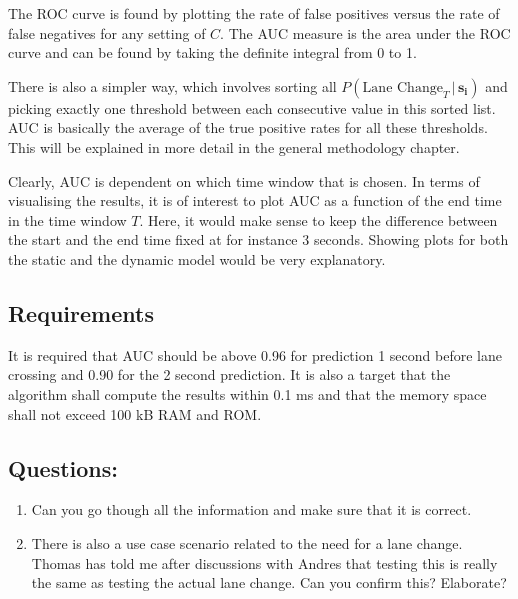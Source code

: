 \documentclass{article}
\theoremstyle{theorem}
\theoremstyle{definition}
\newcommand{\bu}[1]{\mathbf{#1}}
\begin{document}
The ROC curve is found by plotting the rate of false positives versus the rate of false negatives for any setting of $C$.  The AUC measure is the area under the ROC curve and can be found by taking the definite integral from 0 to 1.

There is also a simpler way, which involves sorting all $P(\mbox{Lane Change}_{T} \,|\,  \bu{s_{i}})$ and picking exactly one threshold between each consecutive value in this sorted list.  AUC is basically the average of the true positive rates for all these thresholds. This will be explained in more detail in the general methodology chapter.

Clearly, AUC is dependent on which time window that is chosen.  In terms of visualising the results, it is of interest to plot AUC as a function of the end time in the time window $T$. Here, it would make sense to keep the difference between the start and the end time fixed at for instance 3 seconds.  Showing plots for both the static and the dynamic model would be very explanatory.

\subsection*{Requirements}
It is required that AUC should be above 0.96 for prediction 1 second before lane crossing and 0.90 for the 2 second prediction.  It is also a target that the algorithm shall compute the results within 0.1 ms and that the memory space shall not exceed 100 kB RAM and ROM.

\subsection*{Questions: }
\begin{enumerate}
\item Can you go though all the information and make sure that it is correct.
\item There is also a use case scenario related to the need for a lane change.  Thomas has told me after discussions with Andres that testing this is really the same as testing the actual lane change.  Can you confirm this? Elaborate?
\end{enumerate}
\end{document}

